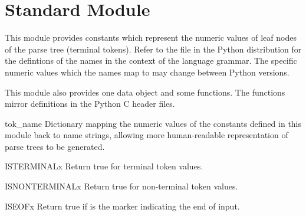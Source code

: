 \section{Standard Module }



This module provides constants which represent the numeric values of
leaf nodes of the parse tree (terminal tokens).  Refer to the file
 in the Python distribution for the defintions
of the names in the context of the language grammar.  The specific
numeric values which the names map to may change between Python
versions.

This module also provides one data object and some functions.  The
functions mirror definitions in the Python C header files.



\begin{datadesc}{tok_name}
Dictionary mapping the numeric values of the constants defined in this
module back to name strings, allowing more human-readable
representation of parse trees to be generated.
\end{datadesc}

\begin{funcdesc}{ISTERMINAL}{x}
Return true for terminal token values.
\end{funcdesc}

\begin{funcdesc}{ISNONTERMINAL}{x}
Return true for non-terminal token values.
\end{funcdesc}

\begin{funcdesc}{ISEOF}{x}
Return true if  is the marker indicating the end of input.
\end{funcdesc}

\begin{seealso}
\end{seealso}
